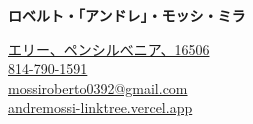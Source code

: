 \documentclass{../../Styles/AndreCV-RStyle}
\begin{document}
\begin{center}
    \textbf{\huge{ロベルト・「アンドレ」・モッシ・ミラ}}\\

    \vspace{0.3cm}

    \small{
        \href{https://www.google.com/maps?q=42.127033,-80.088276}{エリー、ペンシルべニア、16506}\\
        \href{tel:+18147901591}{814-790-1591}\\
        \href{mailto:mossiroberto0392@gmail.com}{mossiroberto0392@gmail.com}\\
        \href{https://andremossi-linktree.vercel.app/}{andremossi-linktree.vercel.app}
    }
    \vspace{0.5cm}
\end{center}
\end{document}
